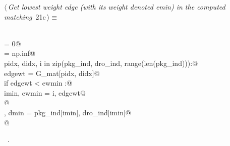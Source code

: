 \documentclass[10pt, english, oneside]{report}
\begin{document}
\begin{flushleft} \small
\begin{minipage}{\linewidth}\label{scrap23}\raggedright\small
{} $\langle\,${\itshape Get lowest weight edge (with its weight denoted emin) in the computed matching}\nobreak\ {\footnotesize {21c}}$\,\rangle\equiv$
\vspace{-1ex}
\begin{list}{}{} \item
\mbox{}\verb@@\\
\mbox{}\verb@imin  = 0@\\
\mbox{}\verb@ewmin = np.inf@\\
\mbox{}\verb@for pidx, didx, i in zip(pkg_ind, dro_ind, range(len(pkg_ind))):@\\
\mbox{}\verb@    edgewt = G_mat[pidx, didx]@\\
\mbox{}\verb@    if edgewt < ewmin :@\\
\mbox{}\verb@          imin, ewmin  = i, edgewt@\\
\mbox{}\verb@          @\\
\mbox{}\verb@pmin, dmin = pkg_ind[imin], dro_ind[imin]@\\
\mbox{}\verb@  @\\
\mbox{}\verb@@{\NWsep}
\end{list}
\vspace{-1.5ex}
\footnotesize
\begin{list}{}{\setlength{\itemsep}{-\parsep}\setlength{\itemindent}{-\leftmargin}}
\item \NWtxtMacroRefIn\ .

\item{}
\end{list}
\end{minipage}\vspace{4ex}
\end{flushleft}
\end{document}
